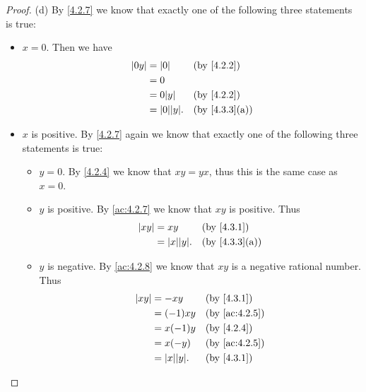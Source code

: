 \begin{proof}{(d)}
  By \cref{4.2.7} we know that exactly one of the following three statements is true:
  \begin{itemize}
    \item \(x = 0\).
          Then we have
          \begin{align*}
            \abs{0y} & = \abs{0}          &  & \by{4.2.2}                  \\
                     & = 0                                                 \\
                     & = 0 \abs{y}        &  & \by{4.2.2}                  \\
                     & = \abs{0} \abs{y}. &  & \text{(by \cref{4.3.3}(a))}
          \end{align*}
    \item \(x\) is positive.
          By \cref{4.2.7} again we know that exactly one of the following three statements is true:
          \begin{itemize}
            \item \(y = 0\).
                  By \cref{4.2.4} we know that \(xy = yx\), thus this is the same case as \(x = 0\).
            \item \(y\) is positive.
                  By \cref{ac:4.2.7} we know that \(xy\) is positive.
                  Thus
                  \begin{align*}
                    \abs{xy} & = xy               &  & \by{4.3.1}                  \\
                             & = \abs{x} \abs{y}. &  & \text{(by \cref{4.3.3}(a))}
                  \end{align*}
            \item \(y\) is negative.
                  By \cref{ac:4.2.8} we know that \(xy\) is a negative rational number.
                  Thus
                  \begin{align*}
                    \abs{xy} & = -xy              &  & \by{4.3.1}    \\
                             & = (-1)xy           &  & \by{ac:4.2.5} \\
                             & = x(-1)y           &  & \by{4.2.4}    \\
                             & = x(-y)            &  & \by{ac:4.2.5} \\
                             & = \abs{x} \abs{y}. &  & \by{4.3.1}    \\
                  \end{align*}

\end{itemize}
\end{itemize}
\end{proof}
